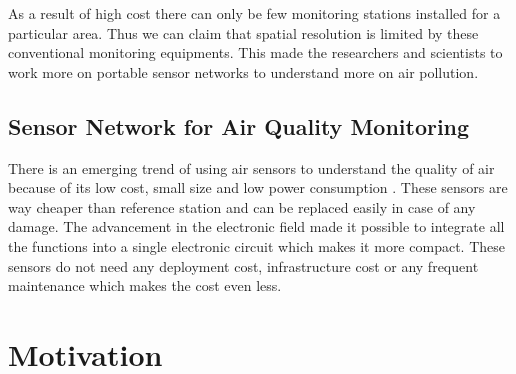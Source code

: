 As a result of high cost there can only be few monitoring stations installed for a particular area. Thus we can claim that spatial resolution is limited by these conventional monitoring equipments. This made the researchers and scientists to work more on portable sensor networks to understand more on air pollution.



\subsection{Sensor Network for Air Quality Monitoring}

There is an emerging trend of using air sensors to understand the quality of air because of its low cost, small size and low power consumption \cite{Sun2016}. These sensors are way cheaper than reference station and can be replaced easily in case of any damage. The advancement in the electronic field made it possible to integrate all the functions into a single electronic circuit which makes it more compact. These sensors do not need any deployment cost, infrastructure cost or any frequent maintenance which makes the cost even less. 





\section{Motivation}

